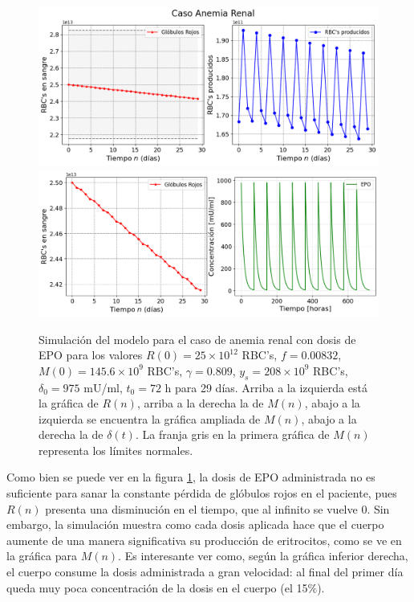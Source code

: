 \begin{figure}[H]
    \centering
    \captionsetup{justification=centering}
    \includegraphics[scale=0.526]{figures/AR11.png}
    \includegraphics[scale=0.526]{figures/AR12.png}
    \caption{Simulación del modelo para el caso de anemia renal con dosis de EPO para los valores $R(0)=25\times 10^{12}$ RBC's, $f=0.00832$, $M(0)=145.6\times 10^{9}$ RBC's, $\gamma = 0.809$, $y_s = 208\times10^{9}$ RBC's, $\delta_0 = 975$ mU/ml, $t_0 =72$ h para 29 días. Arriba a la izquierda está la gráfica de $R(n)$, arriba a la derecha la de $M(n)$, abajo a la izquierda se encuentra la gráfica ampliada de $M(n)$, abajo a la derecha la de $\delta(t)$. La franja gris en la primera gráfica de $M(n)$ representa los límites normales.}
    \label{sec:variaciones:fig:Anemia1}
\end{figure}

Como bien se puede ver en la figura \ref{sec:variaciones:fig:Anemia1}, la dosis de EPO administrada no es suficiente para sanar la constante pérdida de glóbulos rojos en el paciente, pues $R(n)$ presenta una disminución en el tiempo, que al infinito se vuelve 0. Sin embargo, la simulación muestra como cada dosis aplicada hace que el cuerpo aumente de una manera significativa su producción de eritrocitos, como se ve en la gráfica para $M(n)$. Es interesante ver como, según la gráfica inferior derecha, el cuerpo consume la dosis administrada a gran velocidad: al final del primer día queda muy poca concentración de la dosis en el cuerpo (el 15$\%$).


